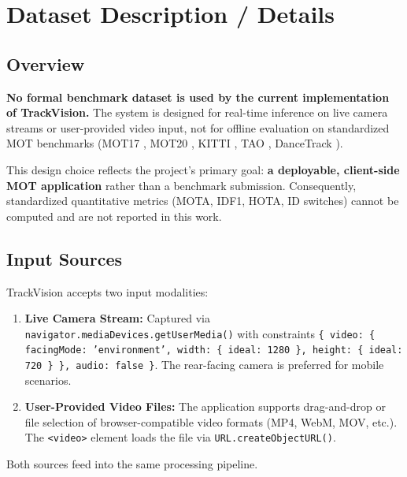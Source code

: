 \chapter{Dataset Description / Details}
\label{ch:dataset}

\section{Overview}
\label{sec:dataset-overview}

\textbf{No formal benchmark dataset is used by the current implementation of TrackVision.} The system is designed for real-time inference on live camera streams or user-provided video input, not for offline evaluation on standardized MOT benchmarks (MOT17 \cite{milan2016mot16}, MOT20 \cite{dendorfer2020mot20}, KITTI \cite{geiger2012kitti}, TAO \cite{dave2020tao}, DanceTrack \cite{sun2022dancetrack}).

This design choice reflects the project's primary goal: \textbf{a deployable, client-side MOT application} rather than a benchmark submission. Consequently, standardized quantitative metrics (MOTA, IDF1, HOTA, ID switches) cannot be computed and are not reported in this work.

\section{Input Sources}
\label{sec:input-sources}

TrackVision accepts two input modalities:

\begin{enumerate}
    \item \textbf{Live Camera Stream:} Captured via \texttt{navigator.mediaDevices.getUserMedia()} with constraints \texttt{\{ video: \{ facingMode: 'environment', width: \{ ideal: 1280 \}, height: \{ ideal: 720 \} \}, audio: false \}}. The rear-facing camera is preferred for mobile scenarios.
    \item \textbf{User-Provided Video Files:} The application supports drag-and-drop or file selection of browser-compatible video formats (MP4, WebM, MOV, etc.). The \texttt{<video>} element loads the file via \texttt{URL.createObjectURL()}.
\end{enumerate}

Both sources feed into the same processing pipeline.

